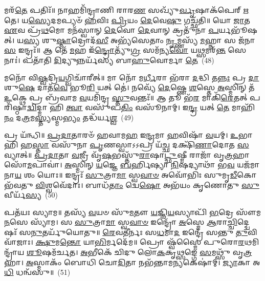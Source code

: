 𑌮𑌰᳴\-\ul{𑌤𑍇} 𑌪𑌤𑌿𑌃᳴॥ 𑌨𑌾𑌹𑌮𑌿᳴𑌨𑍍𑌦𑍍𑌰𑌾𑌣𑌿 𑌰𑌾𑌰\-\ul{𑌣} 𑌸𑌖𑍍𑌯𑍁᳴\-\ul{𑌰𑍍𑌵𑍃}\-𑌷𑌾𑌕᳴𑌪𑍇𑌰𑍍 \ul{𑌋}\-𑌤𑍇। 𑌯\-\ul{𑌸𑍍𑌯𑍇}\-𑌦𑌮𑌪𑍍𑌯𑍞᳴ \ul{𑌹}\-𑌵𑌿𑌃 \ul{𑌪𑍍𑌰𑌿}\-𑌯𑌂 \ul{𑌦𑍇}\-𑌵𑍇\-\ul{𑌷𑍁} 𑌗𑌚𑍍𑌛᳴𑌤𑌿॥ 𑌯𑍋 \ul{𑌜𑌾}\-𑌤 \ul{𑌏}\-𑌵 𑌪𑍍𑌰᳴\-\ul{𑌥}\-𑌮𑍋 𑌮𑌨᳴𑌸𑍍𑌵𑌾𑌨𑍍 \ul{𑌦𑍇}\-𑌵𑍋 \ul{𑌦𑍇}\-𑌵𑌾𑌨𑍍 𑌕𑍍𑌰𑌤𑍁᳴𑌨𑌾 \ul{𑌪}\-𑌰𑍍𑌯𑌭𑍂᳴𑌷𑌤𑍍। 𑌯\-\ul{𑌸𑍍𑌯} 𑌶𑍁\-\ul{𑌷𑍍𑌮𑌾}\-𑌦𑍍𑌰𑍋𑌦᳴\-\ul{𑌸𑍀} 𑌅𑌭𑍍𑌯᳴𑌸𑍇𑌤𑌾𑌂 \ul{𑌨𑍃}\-𑌮𑍍𑌣𑌸𑍍𑌯᳴ \ul{𑌮}\-𑌹𑍍𑌨𑌾 𑌸 𑌜᳴𑌨𑌾\-\ul{𑌸} 𑌇𑌨𑍍𑌦𑍍𑌰𑌃᳴॥ 𑌆 𑌤𑍇᳴ \ul{𑌮}\-𑌹 𑌇᳴\-\ul{𑌨𑍍𑌦𑍍𑌰𑍋}\-𑌤𑍍𑌯𑍁᳴\-\ul{𑌗𑍍𑌰} 𑌸𑌮᳴𑌨𑍍𑌯\-\ul{𑌵𑍋} 𑌯\-\ul{𑌥𑍍𑌸}\-𑌮𑌰᳴\-\ul{𑌨𑍍𑌤} 𑌸𑍇𑌨𑌾𑌃॑। 𑌪𑌤𑌾᳴𑌤𑌿 \ul{𑌦𑌿}\-𑌦𑍍𑌯𑍁𑌨𑍍𑌨𑌰𑍍𑌯᳴𑌸𑍍𑌯 𑌬𑌾\-\ul{𑌹𑍁}\-𑌵𑍋𑌰𑍍𑌮𑌾 \ul{𑌤𑍇}\-~(48)

𑌮𑌨𑍋᳴ 𑌵𑌿\-\ul{𑌷𑍍𑌵}\-𑌦𑍍𑌰𑌿\-\ul{𑌯}\-𑌗𑍍𑌵𑌿𑌚𑌾᳴𑌰𑍀𑌤𑍍॥ 𑌮𑌾 𑌨𑍋᳴ 𑌮\-\ul{𑌰𑍍𑌧𑍀}\-𑌰𑌾 𑌭᳴𑌰𑌾 \ul{𑌦}\-𑌦𑍍𑌧𑌿 𑌤\-\ul{𑌨𑍍𑌨𑌃} 𑌪𑍍𑌰 \ul{𑌦𑌾}\-𑌶𑍁\-\ul{𑌷𑍇} 𑌦𑌾𑌤᳴\-\ul{𑌵𑍇} 𑌭𑍂\-\ul{𑌰𑌿} 𑌯𑌤𑍍 𑌤𑍇॑। 𑌨𑌵𑍍𑌯𑍇᳴ \ul{𑌦𑍇}\-𑌷𑍍𑌣𑍇 \ul{𑌶}\-𑌸𑍍𑌤𑍇 \ul{𑌅}\-𑌸𑍍𑌮𑌿𑌨𑍍 𑌤᳴ \ul{𑌉}\-𑌕𑍍𑌥𑍇 𑌪𑍍𑌰 𑌬𑍍𑌰᳴𑌵𑌾𑌮 \ul{𑌵}\-𑌯𑌮𑌿᳴𑌨𑍍𑌦𑍍𑌰 \ul{𑌸𑍍𑌤𑍁}\-𑌵𑌨𑍍𑌤𑌃᳴॥ 𑌆 𑌤𑍂 𑌭᳴\-\ul{𑌰} 𑌮𑌾𑌕𑌿᳴\-\ul{𑌰𑍇}\-𑌤𑌤𑍍 𑌪𑌰𑌿᳴𑌷𑍍𑌠𑌾\-\ul{𑌦𑍍𑌵𑌿}\-𑌦𑍍𑌮𑌾 𑌹𑌿 \ul{𑌤𑍍𑌵𑌾} 𑌵𑌸𑍁᳴𑌪\-\ul{𑌤𑌿𑌂} 𑌵𑌸𑍂᳴𑌨𑌾𑌮𑍍। 𑌇\-\ul{𑌨𑍍𑌦𑍍𑌰} 𑌯𑌤𑍍 \ul{𑌤𑍇} 𑌮𑌾𑌹𑌿᳴\-\ul{𑌨𑌂} 𑌦\-\ul{𑌤𑍍𑌰}\-𑌮\-\ul{𑌸𑍍𑌤𑍍𑌯}\-𑌸𑍍𑌮\-\ul{𑌭𑍍𑌯𑌂} 𑌤𑌦𑍍𑌧᳴𑌰𑍍𑌯\-\ul{𑌶𑍍𑌵}\-~(49)

𑌪𑍍𑌰 𑌯᳴𑌨𑍍𑌧𑌿॥ \ul{𑌪𑍍𑌰}\-\-\ul{𑌦𑌾}\-𑌤𑌾𑌰𑍞᳴ 𑌹𑌵𑌾𑌮\-\ul{𑌹} 𑌇\-\ul{𑌨𑍍𑌦𑍍𑌰}\-𑌮𑌾 \ul{𑌹}\-𑌵𑌿𑌷𑌾᳴ \ul{𑌵}\-𑌯𑌮𑍍। \ul{𑌉}\-𑌭𑌾 𑌹𑌿 𑌹\-\ul{𑌸𑍍𑌤𑌾} 𑌵𑌸𑍁᳴𑌨𑌾 \ul{𑌪𑍃}\-𑌣𑌸𑍍𑌵𑌾\-𑌽\-𑌽𑌪𑍍𑌰 𑌯᳴\-\ul{𑌚𑍍𑌛} 𑌦𑌕𑍍𑌷𑌿᳴\-\ul{𑌣𑌾}\-𑌦𑍋𑌤 \ul{𑌸}\-𑌵𑍍𑌯𑌾𑌤𑍍॥ \ul{𑌪𑍍𑌰}\-\-\ul{𑌦𑌾}\-𑌤𑌾 \ul{𑌵}\-𑌜𑍍𑌰𑍀 𑌵𑍃᳴\-\ul{𑌷}\-𑌭𑌸𑍍𑌤𑍁᳴\-\ul{𑌰𑌾}\-𑌷𑌾\-\ul{𑌟𑍍𑌛𑍁}\-𑌷𑍍𑌮𑍀 𑌰𑌾𑌜𑌾᳴ 𑌵𑍃\-\ul{𑌤𑍍𑌰}\-𑌹𑌾 𑌸𑍋᳴\-\ul{𑌮}\-𑌪𑌾𑌵𑌾॑। \ul{𑌅}\-𑌸𑍍𑌮𑌿𑌨𑍍 \ul{𑌯}\-𑌜𑍍𑌞𑍇 \ul{𑌬}\-𑌰𑍍\mbox{}𑌹𑌿𑌷𑍍𑌯𑌾 \ul{𑌨𑌿}\-𑌷𑌦𑍍𑌯𑌾𑌥𑌾᳴ 𑌭\-\ul{𑌵} 𑌯𑌜᳴𑌮𑌾𑌨𑌾\-\ul{𑌯} 𑌶𑌂 𑌯𑍋𑌃॥ 𑌇𑌨𑍍𑌦𑍍𑌰𑌃᳴ \ul{𑌸𑍁}\-𑌤𑍍𑌰𑌾\-\ul{𑌮𑌾} 𑌸𑍍𑌵\-\ul{𑌵𑌾}\-\-\ul{𑍞} 𑌅𑌵𑍋᳴𑌭𑌿𑌃 𑌸𑍁𑌮𑍃\-\ul{𑌡𑍀}\-𑌕𑍋 𑌭᳴𑌵𑌤𑍁 \ul{𑌵𑌿}\-𑌶𑍍𑌵𑌵𑍇᳴𑌦𑌾𑌃। 𑌬𑌾𑌧᳴\-\ul{𑌤𑌾𑌂} 𑌦𑍍𑌵𑍇\-\ul{𑌷𑍋} 𑌅𑌭᳴𑌯𑌂 𑌕𑍃𑌣𑍋𑌤𑍁 \ul{𑌸𑍁}\-𑌵𑍀𑌰𑍍𑌯᳴\-\ul{𑌸𑍍𑌯}\-~(50)

𑌪𑌤᳴𑌯𑌃 𑌸𑍍𑌯𑌾𑌮॥ 𑌤𑌸𑍍𑌯᳴ \ul{𑌵}\-𑌯𑍞 𑌸𑍁᳴\-\ul{𑌮}\-𑌤𑍗 \ul{𑌯}\-𑌜𑍍𑌞𑌿\-\ul{𑌯}\-𑌸𑍍𑌯𑌾𑌪𑌿᳴ \ul{𑌭}\-𑌦𑍍𑌰𑍇 𑌸𑍗᳴𑌮\-\ul{𑌨}\-𑌸𑍇 𑌸𑍍𑌯𑌾᳴𑌮। 𑌸 \ul{𑌸𑍁}\-𑌤𑍍𑌰𑌾\-\ul{𑌮𑌾} 𑌸𑍍𑌵\-\ul{𑌵𑌾}\-\-\ul{𑍞} 𑌇𑌨𑍍𑌦𑍍𑌰𑍋᳴ \ul{𑌅}\-𑌸𑍍𑌮𑍇 \ul{𑌆}\-𑌰𑌾\-\ul{𑌚𑍍𑌚𑌿}\-𑌦𑍍𑌦𑍍𑌵𑍇𑌷𑌃᳴ 𑌸\-\ul{𑌨𑍁}\-𑌤𑌰𑍍𑌯𑍁᳴𑌯𑍋𑌤𑍁॥ \ul{𑌰𑍇}\-𑌵𑌤𑍀॑𑌰𑍍𑌨𑌃 𑌸\-\ul{𑌧}\-𑌮𑌾\-\ul{𑌦} 𑌇𑌨𑍍𑌦𑍍𑌰𑍇᳴ 𑌸𑌨𑍍𑌤𑍁 \ul{𑌤𑍁}\-𑌵𑌿𑌵𑌾᳴𑌜𑌾𑌃। \ul{𑌕𑍍𑌷𑍁}\-𑌮\-\ul{𑌨𑍍𑌤𑍋} 𑌯𑌾\-\ul{𑌭𑌿}\-𑌰𑍍𑌮𑌦𑍇᳴𑌮॥ 𑌪𑍍𑌰𑍋 𑌷𑍍𑌵᳴𑌸𑍍𑌮𑍈 𑌪𑍁𑌰𑍋\-\ul{𑌰}\-𑌥𑌮𑌿𑌨𑍍𑌦𑍍𑌰𑌾᳴𑌯 \ul{𑌶𑍂}\-𑌷𑌮᳴𑌰𑍍𑌚𑌤। \ul{𑌅}\-𑌭𑍀𑌕𑍇᳴ 𑌚𑌿𑌦𑍁 𑌲𑍋\-\ul{𑌕}\-𑌕𑍃\-\ul{𑌥𑍍𑌸}\-𑌙𑍍𑌗𑍇 \ul{𑌸}\-𑌮𑌥𑍍𑌸𑍁᳴ 𑌵𑍃\-\ul{𑌤𑍍𑌰}\-𑌹𑌾। \ul{𑌅}\-𑌸𑍍𑌮𑌾𑌕𑌂᳴ 𑌬𑍋𑌧𑌿 𑌚𑍋\-\ul{𑌦𑌿}\-𑌤𑌾 𑌨𑌭᳴𑌨𑍍𑌤𑌾𑌮\-\ul{𑌨𑍍𑌯}\-𑌕𑍇𑌷𑌾॑𑌮𑍍। \ul{𑌜𑍍𑌯𑌾}\-𑌕𑌾 𑌅\-\ul{𑌧𑌿} 𑌧𑌨𑍍𑌵᳴𑌸𑍁॥~(51)

{\anuvakamend[{\-\ul{𑌜}\-𑌰\-\ul{𑌸𑌾} 𑌮𑌾 𑌤𑍇᳴ 𑌹𑌰𑍍𑌯𑌶𑍍𑌵 \ul{𑌸𑍁}\-𑌵𑍀\-\ul{𑌰𑍍𑌯}\-𑌸𑍍𑌯𑌾𑌧𑍍𑌯𑍇𑌕𑌂᳴ 𑌚}]}%
